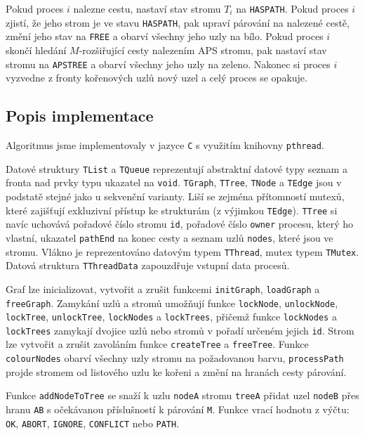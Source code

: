 \documentclass[a4paper, 11pt, titlepage, final]{article}[3. prosinec 2011]
\begin{document}
Pokud proces $i$ nalezne cestu, nastaví stav stromu $T_i$ na \texttt{HASPATH}. Pokud proces $i$ zjistí, že jeho strom je ve stavu \texttt{HASPATH}, pak upraví párování na nalezené cestě, změní jeho stav na \texttt{FREE} a obarví všechny jeho uzly na bílo. Pokud proces $i$ skončí hledání $M$-rozšiřující cesty nalezením APS stromu, pak nastaví stav stromu na \texttt{APSTREE} a obarví všechny jeho uzly na zeleno. Nakonec si proces $i$ vyzvedne z fronty kořenových uzlů nový uzel a celý proces se opakuje.

\subsection{Popis implementace}

Algoritmus jsme implementovaly v jazyce \texttt{C} s využitím knihovny \texttt{pthread}. 

Datové struktury \texttt{TList} a \texttt{TQueue} reprezentují abstraktní datové typy seznam a fronta nad prvky typu ukazatel na \texttt{void}. \texttt{TGraph}, \texttt{TTree}, \texttt{TNode} a \texttt{TEdge} jsou v podstatě stejné jako u sekvenční varianty. Liší se zejména přítomností mutexů, které zajišťují exkluzivní přístup ke strukturám (z výjimkou \texttt{TEdge}). \texttt{TTree} si navíc uchovává pořadové číslo stromu \texttt{id}, pořadové číslo \texttt{owner} procesu, který ho vlastní, ukazatel \texttt{pathEnd} na konec cesty a seznam uzlů \texttt{nodes}, které jsou ve stromu. Vlákno je reprezentováno datovým typem \texttt{TThread}, mutex typem \texttt{TMutex}. Datová struktura \texttt{TThreadData} zapouzdřuje vstupní data procesů.

Graf lze inicializovat, vytvořit a zrušit funkcemi \texttt{initGraph}, \texttt{loadGraph} a \texttt{freeGraph}. Zamykání uzlů a stromů umožňují funkce \texttt{lockNode}, \texttt{unlockNode}, \texttt{lockTree}, \texttt{unlockTree}, \texttt{lockNodes} a \texttt{lockTrees}, přičemž funkce \texttt{lockNodes} a \texttt{lockTrees} zamykají dvojice uzlů nebo stromů v pořadí určeném jejich \texttt{id}. Strom lze vytvořit a zrušit zavoláním funkce \texttt{createTree} a \texttt{freeTree}. Funkce \texttt{colourNodes} obarví všechny uzly stromu na požadovanou barvu, \texttt{processPath} projde stromem od listového uzlu ke kořeni a změní na hranách cesty párování.

Funkce \texttt{addNodeToTree} se snaží k uzlu \texttt{nodeA} stromu \texttt{treeA} přidat uzel \texttt{nodeB} přes hranu \texttt{AB} s očekávanou příslušností k párování \texttt{M}. Funkce vrací hodnotu z výčtu: \texttt{OK}, \texttt{ABORT}, \texttt{IGNORE}, \texttt{CONFLICT} nebo \texttt{PATH}. 
\end{document}
